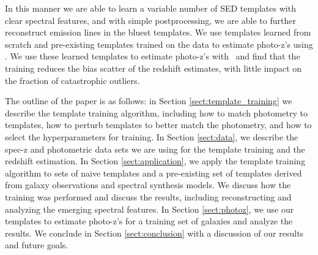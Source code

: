 In this manner we are able to learn a variable number of SED templates with clear spectral features, and with simple postprocessing, we are able to further reconstruct emission lines in the bluest templates.
We use templates learned from scratch and pre-existing templates trained on the data to estimate photo-z's using \bpz \citep{Benitez2000a}.
We use these learned templates to estimate photo-z's with \bpz\ and find that the training reduces the bias scatter of the redshift estimates, with little impact on the fraction of catastrophic outliers.

The outline of the paper is as follows:
in Section \ref{sect:template_training} we describe the template training algorithm, including how to match photometry to templates, how to perturb templates to better match the photometry, and how to select the hyperparameters for training.
In Section \ref{sect:data}, we describe the spec-z and photometric data sets we are using for the template training and the redshift estimation.
In Section \ref{sect:application}, we apply the template training algorithm to sets of naive templates and a pre-existing set of templates derived from galaxy observations and spectral synthesis models.
We discuss how the training was performed and discuss the results, including reconstructing and analyzing the emerging spectral features.
In Section \ref{sect:photoz}, we use our templates to estimate photo-z's for a training set of galaxies and analyze the results.
We conclude in Section \ref{sect:conclusion} with a discussion of our results and future goals.



